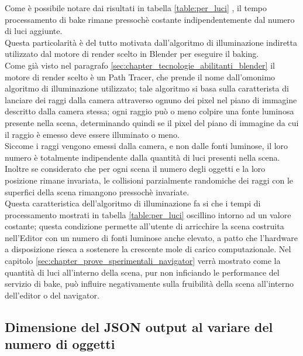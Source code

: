 Come è possibile notare dai risultati in tabella \ref{table:per_luci} , il tempo processamento di bake rimane pressochè costante indipendentemente dal numero di luci aggiunte. 
\\
Questa particolarità è del tutto motivata dall’algoritmo di illuminazione indiretta utilizzato dal motore di render scelto in Blender per eseguire il baking. 
\\
Come già visto nel paragrafo \ref{sec:chapter_tecnologie_abilitanti_blender} il motore di render scelto è un Path Tracer, che prende il nome dall’omonimo algoritmo di illuminazione utilizzato; tale algoritmo si basa sulla caratterista di lanciare dei raggi dalla camera attraverso ognuno dei pixel nel piano di immagine descritto dalla camera stessa; ogni raggio può o meno colpire una fonte luminosa presente nella scena, determinando quindi se il pixel del piano di immagine da cui il raggio è emesso deve essere illuminato o meno. 
\\
Siccome i raggi vengono emessi dalla camera, e non dalle fonti luminose, il loro numero è totalmente indipendente dalla quantità di luci presenti nella scena. 
\\
Inoltre se considerato che per ogni scena il numero degli oggetti e la loro posizione rimane invariata, le collisioni parzialmente randomiche dei raggi con le superfici della scena rimangono pressochè invariate.
\\ 
Questa caratteristica dell’algoritmo di illuminazione fa si che i tempi di processamento mostrati in tabella \ref{table:per_luci} oscillino intorno ad un valore costante; questa condizione permette all’utente di arricchire la scena costruita nell’Editor con un numero di fonti luminose anche elevato, a patto che l’hardware a disposizione riesca a sostenere la crescente mole di carico computazionale. Nel capitolo \ref{sec:chapter_prove_sperimentali_navigator} verrà mostrato come la quantità di luci all’interno della scena, pur non inficiando le performance del servizio di bake, può influire negativamente sulla fruibilità della scena all’interno dell’editor o del navigator.

\subsection{Dimensione del JSON output al variare del numero di oggetti}
\label{sec:chapter_prove_sperimentali_servizio_baking_dim_obj}

